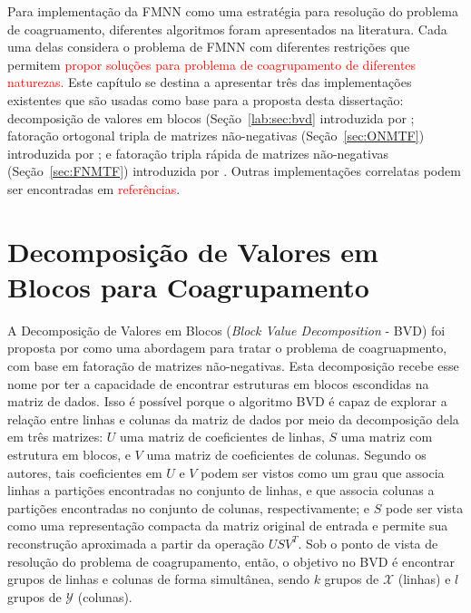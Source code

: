 \documentclass[
    12pt,                %
    oneside,            %
    a4paper,            %
    english,            %
    brazil                %
    ]{abntex2ppgsi}
\begin{document}

Para implementação da FMNN como uma estratégia para resolução do problema de coagruamento, diferentes algoritmos foram apresentados na literatura. Cada uma delas considera o problema de FMNN com diferentes restrições que permitem \textcolor{red}{propor soluções para problema de coagrupamento de diferentes naturezas.} Este capítulo se destina a apresentar três das implementações existentes que são usadas como base para a proposta desta dissertação: decomposição de valores em blocos (Seção~\ref{lab:sec:bvd} introduzida por ; fatoração ortogonal tripla de matrizes não-negativas (Seção~\ref{sec:ONMTF}) introduzida por ; e fatoração tripla rápida de matrizes não-negativas (Seção~\ref{sec:FNMTF}) introduzida por . Outras implementações correlatas podem ser encontradas em \textcolor{red}{referências}.


\section{Decomposição de Valores em Blocos para Coagrupamento}
\label{sec:bvd}

A Decomposição de Valores em Blocos (\textit{Block Value Decomposition} - BVD) foi proposta por  como uma abordagem para tratar o problema de coagruapmento, com base em fatoração de matrizes não-negativas. Esta decomposição recebe esse nome por ter a capacidade de encontrar estruturas em blocos escondidas na matriz de dados. Isso é possível porque o algoritmo BVD é capaz de explorar a relação entre linhas e colunas da matriz de dados por meio da decomposição dela em três matrizes: $U$ uma matriz de coeficientes de linhas, $S$ uma matriz com estrutura em blocos, e $V$ uma matriz de coeficientes de colunas. Segundo os autores, tais coeficientes em $U$ e $V$ podem ser vistos como um grau que associa linhas a partições encontradas no conjunto de linhas, e que associa colunas a partições encontradas no conjunto de colunas, respectivamente; e $S$ pode ser vista como uma representação compacta da matriz original de entrada e permite sua reconstrução aproximada a partir da operação $USV^T$. Sob o ponto de vista de resolução do problema de coagrupamento, então, o objetivo no BVD é encontrar grupos de linhas e colunas de forma simultânea, sendo $k$ grupos de $\mathcal{X}$ (linhas) e $l$ grupos de $\mathcal{Y}$ (colunas).
\end{document}
